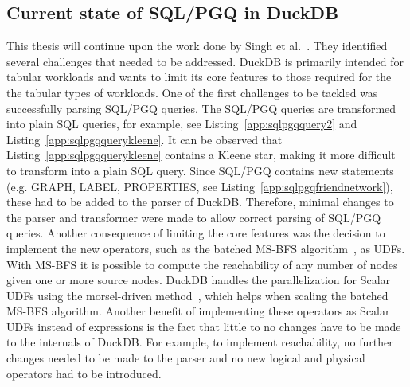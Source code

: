\subsection{Current state of SQL/PGQ in DuckDB}\label{sec:sofar}
This thesis will continue upon the work done by Singh et al.~\cite{sqlpgq-duckdb}. They identified several challenges that needed to be addressed. 
DuckDB is primarily intended for tabular workloads and wants to limit its core features to those required for the the tabular types of workloads.
One of the first challenges to be tackled was successfully parsing SQL/PGQ queries. 
The SQL/PGQ queries are transformed into plain SQL queries, for example, see Listing~\ref{app:sqlpgqquery2} and Listing~\ref{app:sqlpgqquerykleene}. 
It can be observed that Listing~\ref{app:sqlpgqquerykleene} contains a Kleene star, making it more difficult to transform into a plain SQL query. 
Since SQL/PGQ contains new statements (e.g. GRAPH, LABEL, PROPERTIES, see Listing~\ref{app:sqlpgqfriendnetwork}), these had to be added to the parser of DuckDB. 
Therefore, minimal changes to the parser and transformer were made to allow correct parsing of SQL/PGQ queries.  
Another consequence of limiting the core features was the decision to implement the new operators, such as the batched MS-BFS algorithm~\cite{10.14778/2735496.2735507}, as UDFs. 
With MS-BFS it is possible to compute the reachability of any number of nodes given one or more source nodes. 
DuckDB handles the parallelization for Scalar UDFs using the morsel-driven method~\cite{duckdb-morsel-driven}, which helps when scaling the batched MS-BFS algorithm.
Another benefit of implementing these operators as Scalar UDFs instead of expressions is the fact that little to no changes have to be made to the internals of DuckDB. 
For example, to implement reachability, no further changes needed to be made to the parser and no new logical and physical operators had to be introduced. 

